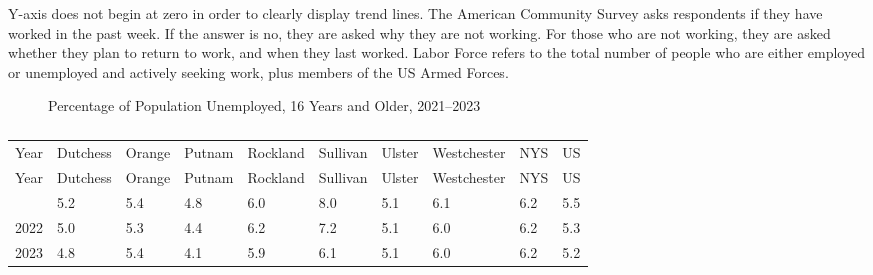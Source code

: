 \documentclass[
  english,
  letterpaper,
]{report}
\begin{document}
\begin{tcolorbox}[enhanced jigsaw, breakable, leftrule=.75mm, title=\textcolor{quarto-callout-note-color}{\faInfo}\hspace{0.5em}{Note}, bottomrule=.15mm, opacityback=0, left=2mm, colback=white, bottomtitle=1mm, coltitle=black, colbacktitle=quarto-callout-note-color!10!white, colframe=quarto-callout-note-color-frame, opacitybacktitle=0.6, toptitle=1mm, titlerule=0mm, arc=.35mm, rightrule=.15mm, toprule=.15mm]

Y-axis does not begin at zero in order to clearly display trend lines.
The American Community Survey asks respondents if they have worked in
the past week. If the answer is no, they are asked why they are not
working. For those who are not working, they are asked whether they plan
to return to work, and when they last worked. Labor Force refers to the
total number of people who are either employed or unemployed and
actively seeking work, plus members of the US Armed Forces.

\end{tcolorbox}

\begin{figure}


\caption{\label{fig-unemployed}Percentage of Population Unemployed, 16
Years and Older, 2021--2023}

\end{figure}%

\begin{longtable}[]{@{}llllllllll@{}}

\caption{\label{tbl-unemployed}Percentage of Population Unemployed, 16
Years and Older, 2021--2023}

\tabularnewline

\caption{}\label{T_0f058}\tabularnewline
\toprule\noalign{}
Year & Dutchess & Orange & Putnam & Rockland & Sullivan & Ulster &
Westchester & NYS & US \\
\midrule\noalign{}
\endfirsthead
\toprule\noalign{}
Year & Dutchess & Orange & Putnam & Rockland & Sullivan & Ulster &
Westchester & NYS & US \\
\midrule\noalign{}
\endhead
\bottomrule\noalign{}
\endlastfoot
2021 & 5.2 & 5.4 & 4.8 & 6.0 & 8.0 & 5.1 & 6.1 & 6.2 & 5.5 \\
2022 & 5.0 & 5.3 & 4.4 & 6.2 & 7.2 & 5.1 & 6.0 & 6.2 & 5.3 \\
2023 & 4.8 & 5.4 & 4.1 & 5.9 & 6.1 & 5.1 & 6.0 & 6.2 & 5.2 \\

\end{longtable}
\end{document}
